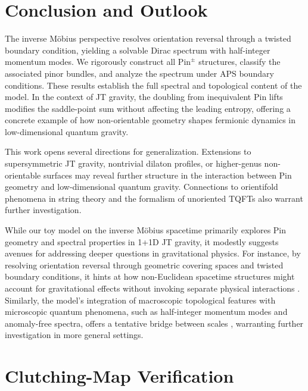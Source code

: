 \documentclass[11pt]{amsart}
\theoremstyle{definition}
\theoremstyle{remark}
\begin{document}

\section{Conclusion and Outlook}

The inverse Möbius perspective resolves orientation reversal through a twisted boundary condition, yielding a solvable Dirac spectrum with half-integer momentum modes. We rigorously construct all $\mathrm{Pin}^{\pm}$ structures, classify the associated pinor bundles, and analyze the spectrum under APS boundary conditions. These results establish the full spectral and topological content of the model. In the context of JT gravity, the doubling from inequivalent Pin lifts modifies the saddle-point sum without affecting the leading entropy, offering a concrete example of how non-orientable geometry shapes fermionic dynamics in low-dimensional quantum gravity.


This work opens several directions for generalization. Extensions to supersymmetric JT gravity, nontrivial dilaton profiles, or higher-genus non-orientable surfaces may reveal further structure in the interaction between Pin geometry and low-dimensional quantum gravity. Connections to orientifold phenomena in string theory and the formalism of unoriented TQFTs also warrant further investigation.


While our toy model on the inverse M\"obius spacetime primarily explores Pin geometry and spectral properties in 1+1D JT gravity, it modestly suggests avenues for addressing deeper questions in gravitational physics. For instance, by resolving orientation reversal through geometric covering spaces and twisted boundary conditions, it hints at how non-Euclidean spacetime structures might account for gravitational effects without invoking separate physical interactions \cite{Einstein1916}. Similarly, the model's integration of macroscopic topological features with microscopic quantum phenomena, such as half-integer momentum modes and anomaly-free spectra, offers a tentative bridge between scales \cite{Rovelli2004}\cite{Giacomini2019}, warranting further investigation in more general settings.

\appendix
\section{Clutching-Map Verification}\label{app:clutch}
\end{document}
